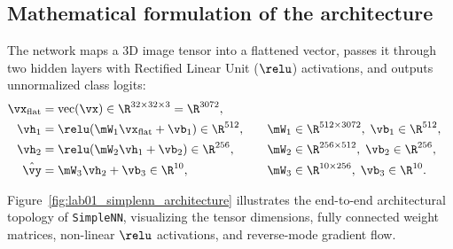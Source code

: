 \documentclass[../labs.tex]{subfiles}
\begin{document}
\subsection{Mathematical formulation of the architecture}
The network maps a 3D image tensor into a flattened vector, passes it through two hidden layers with Rectified Linear Unit ($\relu$) activations, and outputs unnormalized class logits:
\begin{align}
\vx_{\text{flat}} &= \text{vec}(\vx) \in \R^{32 \times 32 \times 3} = \R^{3072}, \\
\vh_1 &= \relu(\mW_1 \vx_{\text{flat}} + \vb_1) \in \R^{512}, \quad &&\mW_1 \in \R^{512 \times 3072}, \; \vb_1 \in \R^{512}, \\
\vh_2 &= \relu(\mW_2 \vh_1 + \vb_2) \in \R^{256}, \quad &&\mW_2 \in \R^{256 \times 512}, \; \vb_2 \in \R^{256}, \\
\hat{\vy} &= \mW_3 \vh_2 + \vb_3 \in \R^{10}, \quad &&\mW_3 \in \R^{10 \times 256}, \; \vb_3 \in \R^{10}.
\end{align}

Figure~\ref{fig:lab01_simplenn_architecture} illustrates the end-to-end architectural topology of \texttt{SimpleNN}, visualizing the tensor dimensions, fully connected weight matrices, non-linear $\relu$ activations, and reverse-mode gradient flow.
\end{document}
